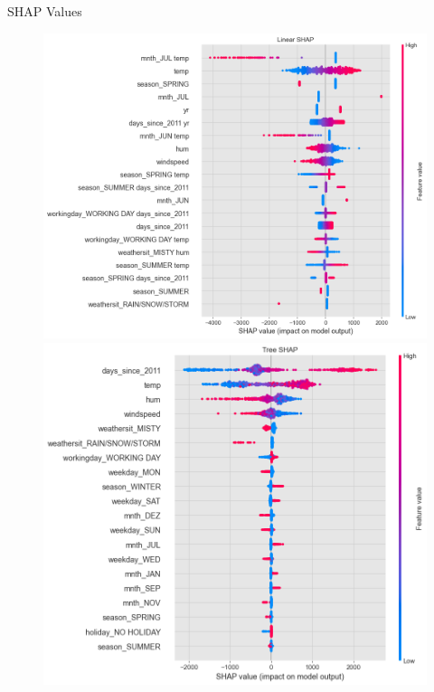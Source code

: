 \documentclass[10pt]{beamer}
\begin{document}
\begin{frame}{SHAP Values}
\begin{center}
  \begin{figure}
    \includegraphics[scale=0.22]{images/interpretable_ml_114_0.png}
    \includegraphics[scale=0.22]{images/interpretable_ml_127_0.png}
  \end{figure}
\end{center}
\end{frame}
\end{document}
